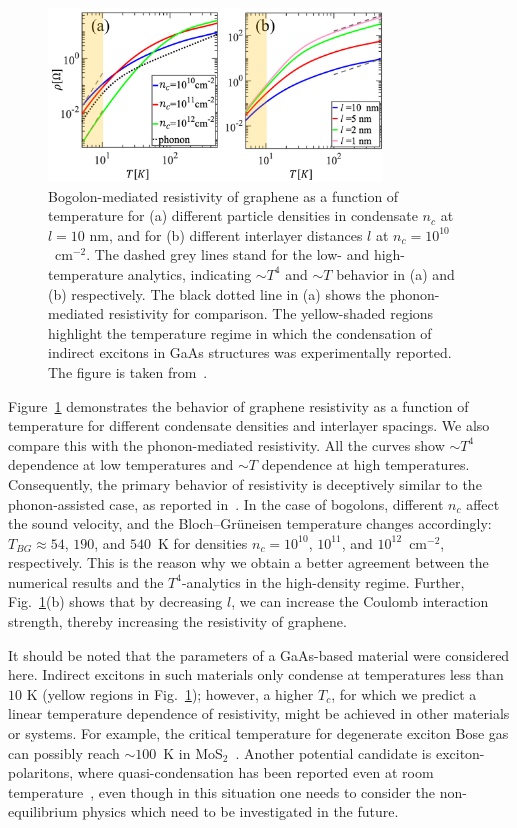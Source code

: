 %
%
%
\begin{figure}[ht]
\centering
    \includegraphics[width=0.79\textwidth]{Fig/Ch6/Fig4.pdf}
    \caption[Temperature-dependent bogolon-mediated resistivity]{Bogolon-mediated resistivity of graphene as a function of temperature for (a) different particle densities in condensate $n_c$ at $l=10$ nm, and for (b) different interlayer distances $l$ at $n_c=10^{10}$~cm$^{-2}$.
    The dashed grey lines stand for the low- and high-temperature analytics, indicating $\sim T^4$ and $\sim T$  behavior in (a) and (b) respectively.
    The black dotted line in (a) shows the phonon-mediated resistivity for comparison.
    The yellow-shaded regions highlight the temperature regime in which the condensation of indirect excitons in GaAs structures was experimentally reported. The figure is taken from~\cite{Sun:2019aa}.}
    \label{fig:CH6_4}
\end{figure}
%
%
%

Figure~\ref{fig:CH6_4} demonstrates the behavior of graphene resistivity as a function of temperature for different condensate densities and interlayer spacings.
We also compare this with the phonon-mediated resistivity.
All the curves show $\sim T^4$ dependence at low temperatures and $\sim T$ dependence at high temperatures.
Consequently, the primary behavior of resistivity is deceptively similar to the phonon-assisted case, as reported in~\cite{Hwang:2008aa}.
In the case of bogolons, different $n_c$ affect the sound velocity, and the Bloch--Gr\"{u}neisen temperature changes accordingly: $T_{BG} \approx 54$, $190$, and $540$~K for densities $n_c=10^{10}$, $10^{11}$, and $10^{12}$~cm$^{-2}$, respectively.
This is the reason why we obtain a better agreement between the numerical results and the $T^4$-analytics in the high-density regime.
Further, Fig.~\ref{fig:CH6_4}(b) shows that by decreasing $l$, we can increase the Coulomb interaction strength, thereby increasing the resistivity of graphene.

It should be noted that the parameters of a GaAs-based material were considered here.
Indirect excitons in such materials only condense at temperatures less than $10$ K (yellow regions in Fig.~\ref{fig:CH6_4}); however, a higher $T_c$, for which we predict a linear temperature dependence of resistivity, might be achieved in other materials or systems.
For example, the critical temperature for degenerate exciton Bose gas can possibly reach $\sim 100$~K in MoS$_2$~\cite{Fogler:2014aa}.
Another potential candidate is exciton-polaritons, where quasi-condensation has been reported even at room temperature~\cite{Lerario:2017aa}, even though in this situation one needs to consider the non-equilibrium physics which need to be investigated in the future.

